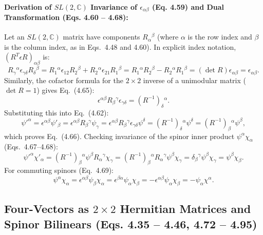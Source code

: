 \documentclass[11pt,a4paper]{article}
\begin{document}
\paragraph{Derivation of $SL(2,\mathbb{C})$ Invariance of $\epsilon_{\alpha\beta}$ (Eq. 4.59) and Dual Transformation (Eqs. 4.60 -- 4.68):}
Let an $SL(2,\mathbb{C})$ matrix have components $R_\alpha{}^\beta$ (where $\alpha$ is the row index and $\beta$ is the column index, as in Eqs.~4.48 and 4.60). In explicit index notation, $(R^T \epsilon R)_{\alpha\beta}$ is:
\begin{equation}
    R_\gamma{}^\alpha \epsilon_{\gamma\delta} R_\delta{}^\beta = R_1{}^\alpha \epsilon_{12} R_2{}^\beta + R_2{}^\alpha \epsilon_{21} R_1{}^\beta = R_1{}^\alpha R_2{}^\beta - R_2{}^\alpha R_1{}^\beta = (\det R)\epsilon_{\alpha\beta} = \epsilon_{\alpha\beta}.
\end{equation}
Similarly, the cofactor formula for the $2\times 2$ inverse of a unimodular matrix ($\det R = 1$) gives Eq.~(4.65):
\begin{equation}
    \epsilon^{\alpha\beta}R_\beta{}^\gamma \epsilon_{\gamma\delta} = (R^{-1})_\delta{}^\alpha.
\end{equation}
Substituting this into Eq.~(4.62):
\begin{equation}
    \psi'^\alpha = \epsilon^{\alpha\beta}\psi'_\beta = \epsilon^{\alpha\beta}R_\beta{}^\gamma \psi_\gamma = \epsilon^{\alpha\beta}R_\beta{}^\gamma \epsilon_{\gamma\delta}\psi^\delta = (R^{-1})_\delta{}^\alpha \psi^\delta = (R^{-1})_\beta{}^\alpha \psi^\beta,
\end{equation}
which proves Eq.~(4.66). Checking invariance of the spinor inner product $\psi^\alpha \chi_\alpha$ (Eqs.~4.67--4.68):
\begin{equation}
    \psi'^\alpha \chi'_\alpha = (R^{-1})_\beta{}^\alpha \psi^\beta R_\alpha{}^\gamma \chi_\gamma = (R^{-1})_\beta{}^\alpha R_\alpha{}^\gamma \psi^\beta \chi_\gamma = \delta_\beta{}^\gamma \psi^\beta \chi_\gamma = \psi^\beta \chi_\beta.
\end{equation}
For commuting spinors (Eq.~4.69):
\begin{equation}
    \psi^\alpha \chi_\alpha = \epsilon^{\alpha\beta}\psi_\beta \chi_\alpha = \epsilon^{\beta\alpha}\psi_\alpha \chi_\beta = -\epsilon^{\alpha\beta}\psi_\alpha \chi_\beta = -\psi_\alpha \chi^\alpha.
\end{equation}

\subsection{Four-Vectors as $2\times 2$ Hermitian Matrices and Spinor Bilinears (Eqs. 4.35 -- 4.46, 4.72 -- 4.95)}
\end{document}
